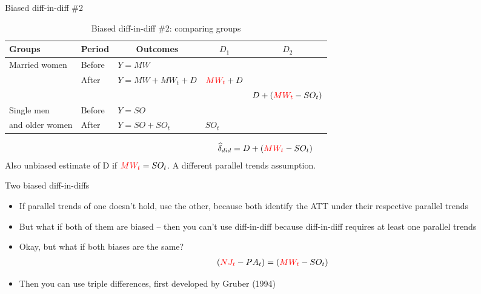 \documentclass{beamer}
\begin{document}
\begin{frame}{Biased diff-in-diff \#2}

\begin{table}\centering
\scriptsize
		\caption{Biased diff-in-diff \#2: comparing groups}
		\begin{center}
		\begin{tabular}{lll|lc}
		\toprule
		\multicolumn{1}{l}{\textbf{Groups}}&
		\multicolumn{1}{c}{\textbf{Period}}&
		\multicolumn{1}{c}{\textbf{Outcomes}}&
		\multicolumn{1}{c}{$D_1$}&
		\multicolumn{1}{c}{$D_2$}\\
		\midrule
		Married women & Before & $Y=MW$ \\
		& After & $Y=MW + MW_t + D$ & $\textcolor{red}{MW_t}+D$\\
		\midrule
		& & & & $D + (\textcolor{red}{MW_t}- SO_t)$ \\
		\midrule
		Single men  & Before & $Y=SO$ \\
		and older women& After & $Y=SO + SO_t$ & $SO_t$\\
		\bottomrule
		\end{tabular}
		\end{center}
	\end{table}

\begin{eqnarray*}
\widehat{\delta}_{did} = D + (\textcolor{red}{MW_t}- SO_t)
\end{eqnarray*}Also unbiased estimate of D if $\textcolor{red}{MW_t} = SO_t$. A different parallel trends assumption.

\end{frame}


\begin{frame}{Two biased diff-in-diffs}

\begin{itemize}

\item If parallel trends of one doesn't hold, use the other, because both identify the ATT under their respective parallel trends
\item But what if both of them are biased -- then you can't use diff-in-diff because diff-in-diff requires at least one parallel trends
\item Okay, but what if both biases are the same?
	\begin{eqnarray*}
	(\textcolor{red}{NJ_t} -PA_t) = (\textcolor{red}{MW_t} - SO_t)
	\end{eqnarray*}
\item Then you can use triple differences, first developed by Gruber (1994)

\end{itemize}

\end{frame}
\end{document}
